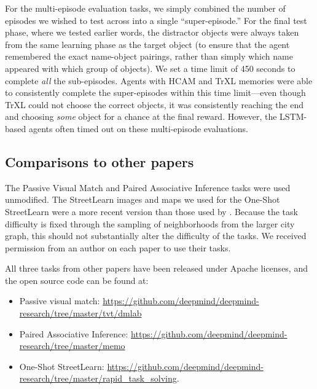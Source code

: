 For the multi-episode evaluation tasks, we simply combined the number of episodes we wished to test across into a single ``super-episode.'' For the final test phase, where we tested earlier words, the distractor objects were always taken from the same learning phase as the target object (to ensure that the agent remembered the exact name-object pairings, rather than simply which name appeared with which group of objects). We set a time limit of 450 seconds to complete \emph{all} the sub-episodes. Agents with HCAM and TrXL memories were able to consistently complete the super-episodes within this time limit---even though TrXL could not choose the correct objects, it was consistently reaching the end and choosing \emph{some} object for a chance at the final reward. However, the LSTM-based agents often timed out on these multi-episode evaluations.

\subsection{Comparisons to other papers} \label{app:tasks:other}

The Passive Visual Match and Paired Associative Inference tasks were used unmodified. The StreetLearn \citep{mirowski2019streetlearn} images and maps we used for the One-Shot StreetLearn were a more recent version than those used by \citet{ritter2020rapid}. Because the task difficulty is fixed through the sampling of neighborhoods from the larger city graph, this should not substantially alter the difficulty of the tasks. We received permission from an author on each paper to use their tasks. 

All three tasks from other papers have been released under Apache licenses, and the open source code can be found at:
\begin{itemize}
    \item Passive visual match: \url{https://github.com/deepmind/deepmind-research/tree/master/tvt/dmlab}
    \item Paired Associative Inference: \url{https://github.com/deepmind/deepmind-research/tree/master/memo}
    \item One-Shot StreetLearn: \url{https://github.com/deepmind/deepmind-research/tree/master/rapid_task_solving}.
\end{itemize}


